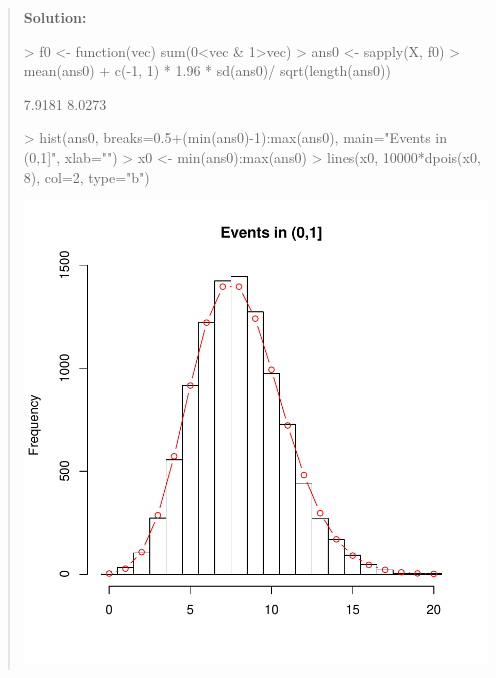 \documentclass{article}
\begin{document}
\begin{enumerate}
\begin{enumerate}
\begin{quotation}{\bf Solution:}
\begin{Schunk}
\begin{Sinput}
> f0 <- function(vec) sum(0<vec & 1>vec)
> ans0 <- sapply(X, f0)
> mean(ans0) + c(-1, 1) * 1.96 * sd(ans0)/ sqrt(length(ans0))
\end{Sinput}
\begin{Soutput}
[1] 7.9181 8.0273
\end{Soutput}
\begin{Sinput}
> hist(ans0, breaks=0.5+(min(ans0)-1):max(ans0), main="Events in (0,1]", xlab="")
> x0 <- min(ans0):max(ans0)
> lines(x0, 10000*dpois(x0, 8), col=2, type="b")
\end{Sinput}
\end{Schunk}
\includegraphics{sol06-002}
  \end{quotation}


\end{enumerate}
\end{enumerate}
\end{document}
